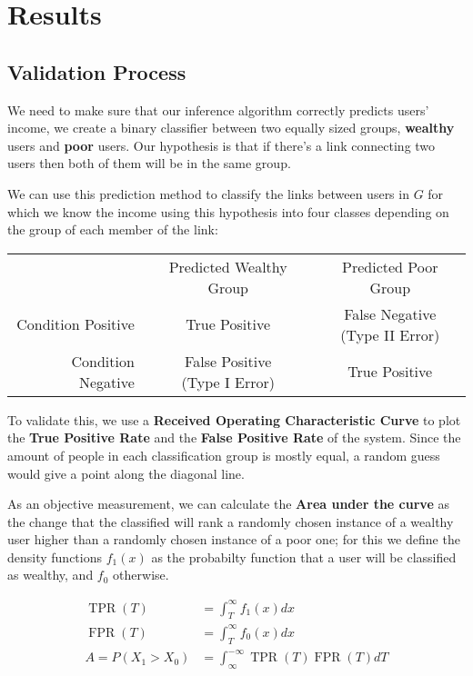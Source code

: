 \section{Results}

\subsection{Validation Process}

We need to make sure that our inference algorithm correctly predicts users' income, we create a binary classifier between two equally sized groups, \textbf{wealthy} users and \textbf{poor} users. Our hypothesis is that if there's a link connecting two users then both of them will be in the same group.

We can use this prediction method to classify the links between users in $ G $ for which we know the income using this hypothesis into four classes depending on the group of each member of the link:

\begin{tabularx}{\textwidth}{ r c c }
& Predicted Wealthy Group & Predicted Poor Group \\
Condition Positive & \cellcolor{green} True Positive & \cellcolor{red} \makecell{False Negative \\ (Type II Error)} \\ 
Condition Negative & \cellcolor{red} \makecell{False Positive \\ (Type I Error)} & \cellcolor{green} True Positive \\
\end{tabularx}

To validate this, we use a \textbf{Received Operating Characteristic Curve} to plot the \textbf{True Positive Rate} and the \textbf{False Positive Rate} of the system. Since the amount of people in each classification group is mostly equal, a random guess would give a point along the diagonal line.

As an objective measurement, we can calculate the \textbf{Area under the curve} as the change that the classified will rank a randomly chosen instance of a wealthy user higher than a randomly chosen instance of a poor one; for this we define the density functions $ f_1(x) $ as the probabilty function that a user will be classified as wealthy, and $ f_0 $ otherwise.

\begin{align*}
\operatorname{TPR}(T) &= \int^{\infty}_T f_1(x) dx \\
\operatorname{FPR}(T) &= \int^{\infty}_T f_0(x) dx \\
A = P(X_1 > X_0) &= \int^{-\infty}_{\infty} \operatorname{TPR}(T) \operatorname{FPR}(T) dT
\end{align*}

